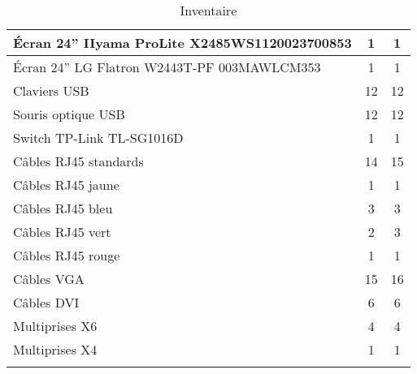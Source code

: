 \begin{center}
\begin{longtable}{|p{10cm}|c|c|}
		\hline Écran 24” IIyama ProLite X2485WS1120023700853 & 1 & 1 \\
		\hline Écran 24” LG Flatron W2443T-PF 003MAWLCM353 & 1 & 1 \\
		\hline Claviers USB & 12 & 12 \\ 
		\hline Souris optique USB & 12 & 12 \\ 
		\hline Switch TP-Link TL-SG1016D & 1 & 1 \\ 
		\hline Câbles RJ45 standards & 14 & 15 \\ 
		\hline Câbles RJ45 jaune & 1 & 1 \\ 
		\hline Câbles RJ45 bleu & 3 & 3 \\ 
		\hline Câbles RJ45 vert & 2 & 3 \\ 
		\hline Câbles RJ45 rouge & 1 & 1 \\ 
		\hline Câbles VGA & 15 & 16 \\ 
		\hline Câbles DVI & 6 & 6 \\ 
		\hline Multiprises X6 & 4 & 4 \\ 
		\hline Multiprises X4 & 1 & 1 \\
                \hline 
\caption[Inventaire]{Inventaire} \label{grid_mlmmh} \\
\end{longtable}
\end{center}
